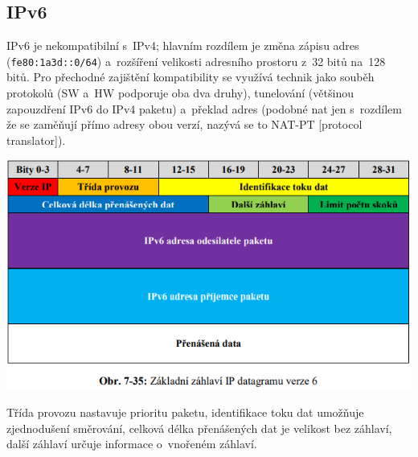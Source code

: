 \subsection{IPv6}

IPv6 je nekompatibilní s~IPv4; hlavním rozdílem je změna zápisu adres (\texttt{fe80:1a3d::0/64}) a~rozšíření velikosti adresního prostoru z~32 bitů na~128 bitů. Pro přechodné zajištění kompatibility se využívá technik jako souběh protokolů (SW a~HW podporuje oba dva druhy), tunelování (většinou zapouzdření IPv6 do IPv4 paketu) a~překlad adres (podobné nat jen s~rozdílem že se zaměňují přímo adresy obou verzí, nazývá se to NAT-PT [protocol translator]).

\begin{center}
	\includegraphics[scale=0.5]{images/-046.png}
\end{center}

Třída provozu nastavuje prioritu paketu, identifikace toku dat umožňuje zjednodušení směrování, celková délka přenášených dat je velikost bez záhlaví, další záhlaví určuje informace o~vnořeném záhlaví.

